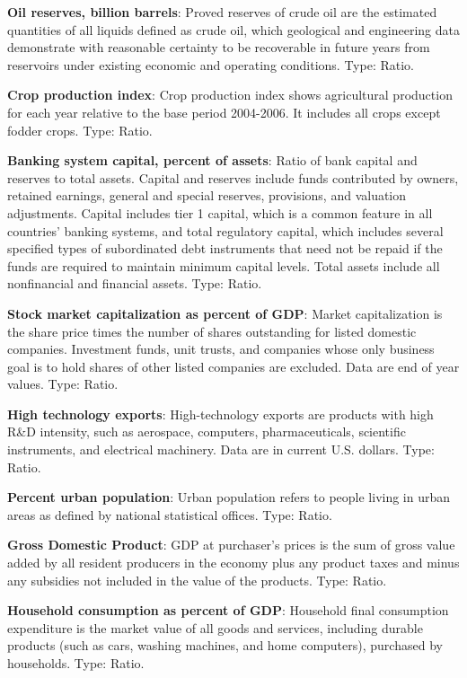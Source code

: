 \documentclass[11pt]{article}
\begin{document}
\begin{appendices}
\textbf{Oil reserves, billion barrels}: Proved reserves of crude oil are the estimated quantities of all liquids defined as crude oil, which geological and engineering data demonstrate with reasonable certainty to be recoverable in future years from reservoirs under existing economic and operating conditions. Type: Ratio.

\textbf{Crop production index}: Crop production index shows agricultural production for each year relative to the base period 2004-2006. It includes all crops except fodder crops. Type: Ratio.

\textbf{Banking system capital, percent of assets}: Ratio of bank capital and reserves to total assets. Capital and reserves include funds contributed by owners, retained earnings, general and special reserves, provisions, and valuation adjustments. Capital includes tier 1 capital, which is a common feature in all countries' banking systems, and total regulatory capital, which includes several specified types of subordinated debt instruments that need not be repaid if the funds are required to maintain minimum capital levels. Total assets include all nonfinancial and financial assets. Type: Ratio.

\textbf{Stock market capitalization as percent of GDP}: Market capitalization is the share price times the number of shares outstanding for listed domestic companies. Investment funds, unit trusts, and companies whose only business goal is to hold shares of other listed companies are excluded. Data are end of year values. Type: Ratio.

\textbf{High technology exports}:  High-technology exports are products with high R\&D intensity, such as aerospace, computers, pharmaceuticals, scientific instruments, and electrical machinery. Data are in current U.S. dollars. Type: Ratio.

\textbf{Percent urban population}: Urban population refers to people living in urban areas as defined by national statistical offices. Type: Ratio.

\textbf{Gross Domestic Product}: GDP at purchaser's prices is the sum of gross value added by all resident producers in the economy plus any product taxes and minus any subsidies not included in the value of the products. Type: Ratio.

\textbf{Household consumption as percent of GDP}: Household final consumption expenditure is the market value of all goods and services, including durable products (such as cars, washing machines, and home computers), purchased by households. Type: Ratio.


\end{appendices}
\end{document}
